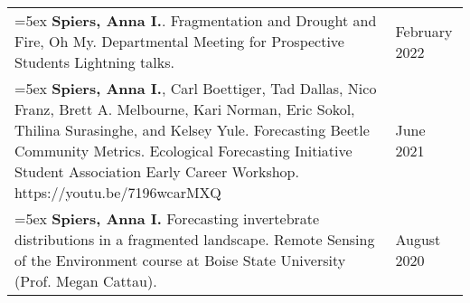 \begin{longtable}{@{}>{\raggedright}p{5.25in} @{} >{\raggedleft}X@{}}

\hangindent=5ex \textbf{Spiers, Anna I.}. Fragmentation and Drought and Fire, Oh My. Departmental Meeting for Prospective Students Lightning talks.  & February 2022 \tabularnewline

\hangindent=5ex \textbf{Spiers, Anna I.}, Carl Boettiger, Tad Dallas, Nico Franz, Brett A. Melbourne, Kari Norman, Eric Sokol, Thilina Surasinghe, and Kelsey Yule. Forecasting Beetle Community Metrics. Ecological Forecasting Initiative Student Association Early Career Workshop. https://youtu.be/7196wcarMXQ & June 2021 \tabularnewline

\hangindent=5ex \textbf{Spiers, Anna I.} Forecasting invertebrate distributions in a fragmented landscape. Remote Sensing of the Environment course at Boise State University (Prof. Megan Cattau). & August 2020  \tabularnewline

\end{longtable}
